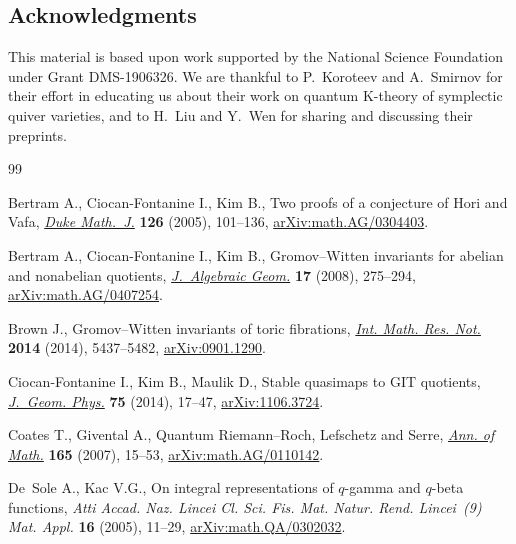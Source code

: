 \documentclass[10pt,a4paper]{amsart}
\numberwithin{equation}{section}
\theoremstyle{definition}
\theoremstyle{plain}
\begin{document}
\subsection*{Acknowledgments}

This material is based upon work supported by the National Science Foundation under Grant DMS-1906326.
We are thankful to P.~Koroteev and A.~Smirnov for their effort in educating us about their work on quantum K-theory of symplectic quiver varieties, and to H.~Liu and Y.~Wen for sharing and discussing their preprints.


\begin{thebibliography}{99}
\footnotesize\itemsep=0pt

Bertram A., Ciocan-Fontanine I., Kim B., Two proofs of a conjecture of {H}ori
 and {V}afa, \href{https://doi.org/10.1215/S0012-7094-04-12613-2}{\textit{Duke Math.~J.}} \textbf{126} (2005), 101--136,
 \href{https://arxiv.org/abs/math.AG/0304403}{arXiv:math.AG/0304403}.

Bertram A., Ciocan-Fontanine I., Kim B., Gromov--{W}itten invariants for
 abelian and nonabelian quotients, \href{https://doi.org/10.1090/S1056-3911-07-00456-0}{\textit{J.~Algebraic Geom.}} \textbf{17}
 (2008), 275--294, \href{https://arxiv.org/abs/math.AG/0407254}{arXiv:math.AG/0407254}.

Brown J., Gromov--{W}itten invariants of toric fibrations, \href{https://doi.org/10.1093/imrn/rnt030}{\textit{Int. Math.
 Res. Not.}} \textbf{2014} (2014), 5437--5482, \href{https://arxiv.org/abs/0901.1290}{arXiv:0901.1290}.

Ciocan-Fontanine I., Kim B., Maulik D., Stable quasimaps to {GIT} quotients,
 \href{https://doi.org/10.1016/j.geomphys.2013.08.019}{\textit{J.~Geom. Phys.}} \textbf{75} (2014), 17--47, \href{https://arxiv.org/abs/1106.3724}{arXiv:1106.3724}.

Coates T., Givental A., Quantum {R}iemann--{R}och, {L}efschetz and {S}erre,
 \href{https://doi.org/10.4007/annals.2007.165.15}{\textit{Ann. of Math.}} \textbf{165} (2007), 15--53, \href{https://arxiv.org/abs/math.AG/0110142}{arXiv:math.AG/0110142}.

De~Sole A., Kac V.G., On integral representations of {$q$}-gamma and {$q$}-beta
 functions, \textit{Atti Accad. Naz. Lincei Cl. Sci. Fis. Mat. Natur. Rend.
 Lincei~(9) Mat. Appl.} \textbf{16} (2005), 11--29, \href{https://arxiv.org/abs/math.QA/0302032}{arXiv:math.QA/0302032}.


\end{thebibliography}
\end{document}
